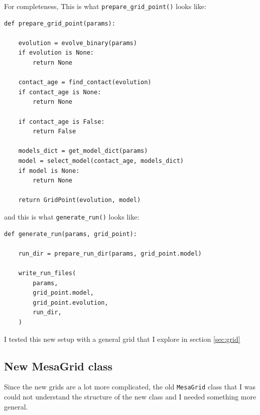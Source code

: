 \documentclass[a4paper,10pt]{article}
\begin{document}
For completeness,
This is what \lstinline[style=output, breaklines=true]|prepare_grid_point()| looks like:
\begin{verbatim}
def prepare_grid_point(params):

    evolution = evolve_binary(params)
    if evolution is None:
        return None

    contact_age = find_contact(evolution)
    if contact_age is None:
        return None

    if contact_age is False:
        return False

    models_dict = get_model_dict(params)
    model = select_model(contact_age, models_dict)
    if model is None:
        return None

    return GridPoint(evolution, model)
\end{verbatim}
and this is what \lstinline[style=output, breaklines=true]|generate_run()| looks like:
\begin{verbatim}
def generate_run(params, grid_point):

    run_dir = prepare_run_dir(params, grid_point.model)

    write_run_files(
        params,
        grid_point.model,
        grid_point.evolution,
        run_dir,
    )
\end{verbatim}

I tested this new setup with a general grid that I explore in section \ref{sec:grid}

\nextpage
\subsection{New MesaGrid class}
Since the new grids are a lot more complicated, the old \lstinline[style=output, breaklines=true]|MesaGrid| class that I was could not understand the structure of the new class and I needed something more general.
\end{document}
